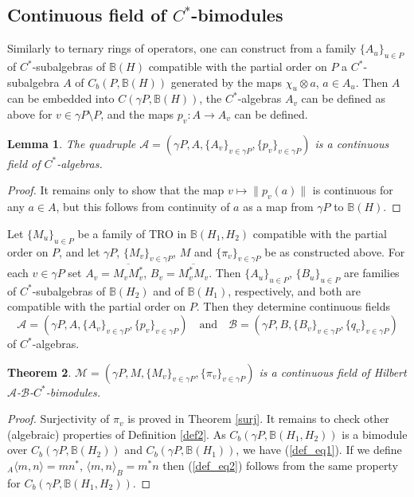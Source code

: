 \documentclass[12pt]{amsart}
\newtheorem{thm}{Theorem}[section]
\newtheorem{lem}[thm]{Lemma}
\theoremstyle{definition}
\begin{document}
\subsection{Continuous field of $C^*$-bimodules}

Similarly to ternary rings of operators, one can construct from a family $\{A_u\}_{u\in P}$ of $C^*$-subalgebras of $\mathbb B(H)$ compatible with the partial order on $P$ a $C^*$-subalgebra $A$ of $C_b(P,\mathbb B(H))$ generated by the maps $\chi_u\otimes a$, $a\in A_u$. Then $A$ can be embedded into $C(\gamma P,\mathbb B(H))$, the $C^*$-algebras $A_v$ can be defined as above for $v\in\gamma P\setminus P$, and the maps $p_v:A\to A_v$ can be defined.

\begin{lem}
The quadruple $\mathcal A=(\gamma P,A,\{A_v\}_{v\in\gamma P},\{p_v\}_{v\in\gamma P})$ is a continuous field of $C^*$-algebras.

\end{lem}
\begin{proof}
It remains only to show that the map $v\mapsto \|p_v(a)\|$ is continuous for any $a\in A$, but this follows from continuity of $a$ as a map from $\gamma P$ to $\mathbb B(H)$.
\end{proof}


Let $\{M_u\}_{u\in P}$ be a family of TRO in $\mathbb B(H_1,H_2)$ compatible with the partial order on $P$, and let $\gamma P$, $\{M_v\}_{v\in\gamma P}$, $M$ and $\{\pi_v\}_{v\in\gamma P}$ be as constructed above. For each $v\in\gamma P$ set $A_v=\overline{M_vM_v^*}$, $B_v=\overline{M_v^*M_v}$. Then $\{A_u\}_{u\in P}$, $\{B_u\}_{u\in P}$ are families of $C^*$-subalgebras of $\mathbb B(H_2)$ and of $\mathbb B(H_1)$, respectively, and both are compatible with the partial order on $P$. Then they determine continuous fields 
$$
\mathcal A=(\gamma P,A,\{A_v\}_{v\in\gamma P},\{p_v\}_{v\in\gamma P})\quad\mbox{and}\quad \mathcal B=(\gamma P,B,\{B_v\}_{v\in\gamma P},\{q_v\}_{v\in\gamma P})
$$ 
of $C^*$-algebras. 

\begin{thm}
$\mathcal M=(\gamma P,M,\{M_v\}_{v\in\gamma P},\{\pi_v\}_{v\in\gamma P})$ is a continuous field of Hilbert $\mathcal A$-$\mathcal B$-$C^*$-bimodules.

\end{thm}
\begin{proof}
Surjectivity of $\pi_v$ is proved in Theorem \ref{surj}. It remains to check other (algebraic) properties of Definition \ref{def2}. As $C_b(\gamma P,\mathbb B(H_1,H_2))$ is a bimodule over $C_b(\gamma P,\mathbb B(H_2))$ and $C_b(\gamma P,\mathbb B(H_1))$, we have (\ref{def_eq1}). If we define ${}_A\langle m,n\rangle=mn^*$, $\langle m,n\rangle_B=m^*n$ then (\ref{def_eq2}) follows from the same property for $C_b(\gamma P,\mathbb B(H_1,H_2))$.  
\end{proof}
\end{document}
